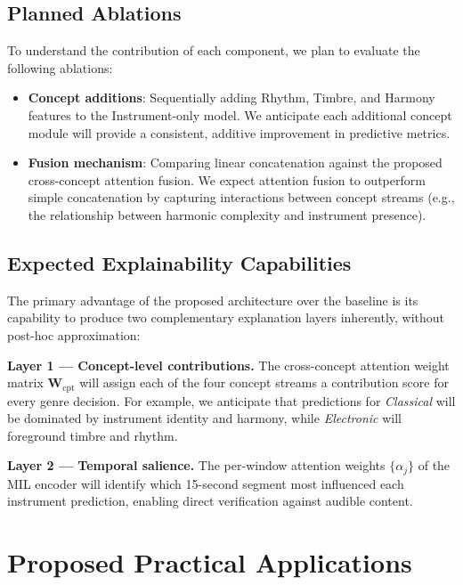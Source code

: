 \documentclass[sigconf,nonacm]{acmart}
\begin{document}
\subsection{Planned Ablations}

To understand the contribution of each component, we plan to evaluate the following ablations:
\begin{itemize}[leftmargin=*]
  \item \textbf{Concept additions}: Sequentially adding Rhythm, Timbre, and Harmony features
        to the Instrument-only model. We anticipate each additional concept module will provide
        a consistent, additive improvement in predictive metrics.
  \item \textbf{Fusion mechanism}: Comparing linear concatenation against the proposed
        cross-concept attention fusion. We expect attention fusion to outperform simple
        concatenation by capturing interactions between concept streams (e.g., the relationship
        between harmonic complexity and instrument presence).
\end{itemize}

\subsection{Expected Explainability Capabilities}

The primary advantage of the proposed architecture over the baseline is its capability to produce
two complementary explanation layers inherently, without post-hoc approximation:

\textbf{Layer 1 --- Concept-level contributions.}
The cross-concept attention weight matrix $\mathbf{W}_{\!\text{cpt}}$ will assign each of the
four concept streams a contribution score for every genre decision. For example, we anticipate
that predictions for \textit{Classical} will be dominated by instrument identity and harmony,
while \textit{Electronic} will foreground timbre and rhythm.

\textbf{Layer 2 --- Temporal salience.}
The per-window attention weights $\{\alpha_j\}$ of the MIL encoder will identify which 15-second
segment most influenced each instrument prediction, enabling direct verification against audible
content.

\section{Proposed Practical Applications}
\end{document}
